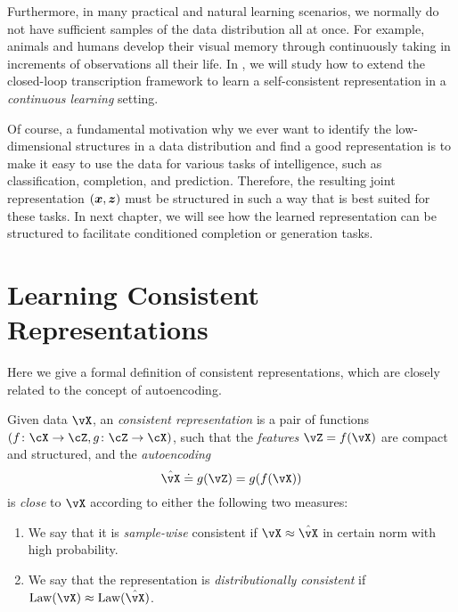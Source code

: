 \documentclass[../../book-main.tex]{subfiles}
\begin{document}
Furthermore, in many practical and natural learning scenarios, we normally do not have sufficient samples of the data distribution all at once. For example, animals and humans develop their visual memory through continuously taking in increments of observations all their life. In , we will study how to extend the closed-loop transcription framework to learn a self-consistent representation in a  {\em continuous learning} setting.

Of course, a fundamental motivation why we ever want to identify the
low-dimensional structures in a data distribution and find a good
representation is to make it easy to use the data for various tasks
of intelligence, such as classification, completion, and prediction.
Therefore, the resulting joint representation $(\bm{x}, \bm{z})$ must be
structured in such a way that is best suited for these tasks. In
next chapter, we will
see how the learned representation can be structured to facilitate
conditioned completion or generation tasks.

\section{Learning Consistent Representations}\label{sec:consistent-representation}

Here we give a formal definition of consistent representations, which
are closely related to the concept of autoencoding. %
\begin{definition}\label{def:bidirectional_rep}
  Given data \(\vX\), an \textit{consistent representation} is a pair
  of functions \((f \colon \cX \to \cZ, g \colon \cZ \to \cX)\), such
  that the \textit{features} \(\vZ = f(\vX)\) are compact and
  structured, and the \textit{autoencoding} 
  \begin{equation}
    \hat{\vX} \doteq g(\vZ) = g(f(\vX))
  \end{equation}
  is \textit{close} to \(\vX\) according to either the
  following two measures:
  \begin{enumerate}
    \item We say that it is \textit{sample-wise} consistent if \(\vX
      \approx \hat{\vX}\) in certain norm with high probability.
    \item We say that the representation is \textit{distributionally
      consistent} if \(\Law(\vX) \approx \Law(\hat{\vX})\).
  \end{enumerate}
\end{definition}
\end{document}
